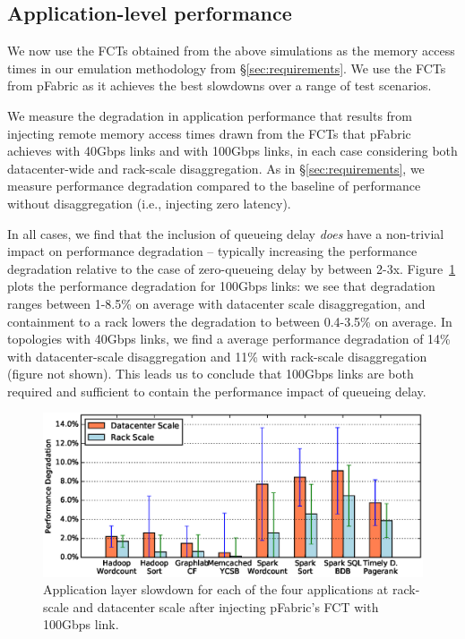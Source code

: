 \vspace{-0.1in}
\subsection{Application-level performance}
\label{ssec:alp}
\vspace{-0.05in}
We now use the FCTs obtained from the above simulations as the memory access times in our emulation methodology from \S\ref{sec:requirements}. We use the FCTs from pFabric as it achieves the best slowdowns over a range of test scenarios. 

We measure the degradation in application performance that results from injecting remote memory access times drawn from the FCTs that pFabric achieves with 40Gbps links and with 100Gbps links, in each case considering both datacenter-wide and rack-scale disaggregation. As in \S\ref{sec:requirements}, we measure performance degradation compared to the baseline of performance without disaggregation (i.e., injecting zero latency). 

In all cases, we find that the inclusion of queueing delay \emph{does} have a non-trivial impact on performance degradation -- typically increasing the performance degradation relative to the case of zero-queueing delay by between 2-3x. 
Figure~\ref{fig:appfabric100} plots the performance degradation for 100Gbps links: we see that degradation ranges between 1-8.5\% on average with datacenter scale disaggregation, and containment to a rack lowers the degradation to between 0.4-3.5\% on average. In topologies with 40Gbps links, we find a average performance degradation of 14\% with datacenter-scale disaggregation and 11\% with rack-scale disaggregation (figure not shown). 
This leads us to conclude that 100Gbps links are both required and sufficient to contain the performance impact of queueing delay.

%
\begin{figure}
  \centering
    \includegraphics[width = \columnwidth]{img/slowdown.eps} 
  \caption{\small{Application layer slowdown for each of the four applications at rack-scale and datacenter scale after injecting pFabric's FCT with 100Gbps link. }}
  \label{fig:appfabric100}
\end{figure}
%

